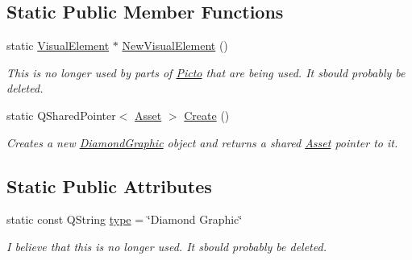 \subsection*{Static Public Member Functions}
\begin{DoxyCompactItemize}
\item 
\hypertarget{class_picto_1_1_diamond_graphic_a43c6757967cb0b0a8de9d6ec728717c8}{static \hyperlink{struct_picto_1_1_visual_element}{Visual\-Element} $\ast$ \hyperlink{class_picto_1_1_diamond_graphic_a43c6757967cb0b0a8de9d6ec728717c8}{New\-Visual\-Element} ()}\label{class_picto_1_1_diamond_graphic_a43c6757967cb0b0a8de9d6ec728717c8}

\begin{DoxyCompactList}\small\item\em This is no longer used by parts of \hyperlink{namespace_picto}{Picto} that are being used. It sbould probably be deleted. \end{DoxyCompactList}\item 
\hypertarget{class_picto_1_1_diamond_graphic_af1b8d46d4894ff874f52c3f6cf7cfb6f}{static Q\-Shared\-Pointer$<$ \hyperlink{class_picto_1_1_asset}{Asset} $>$ \hyperlink{class_picto_1_1_diamond_graphic_af1b8d46d4894ff874f52c3f6cf7cfb6f}{Create} ()}\label{class_picto_1_1_diamond_graphic_af1b8d46d4894ff874f52c3f6cf7cfb6f}

\begin{DoxyCompactList}\small\item\em Creates a new \hyperlink{class_picto_1_1_diamond_graphic}{Diamond\-Graphic} object and returns a shared \hyperlink{class_picto_1_1_asset}{Asset} pointer to it. \end{DoxyCompactList}\end{DoxyCompactItemize}
\subsection*{Static Public Attributes}
\begin{DoxyCompactItemize}
\item 
\hypertarget{class_picto_1_1_diamond_graphic_a6ff7ab9b0e3b296e14e550f80b8a441d}{static const Q\-String \hyperlink{class_picto_1_1_diamond_graphic_a6ff7ab9b0e3b296e14e550f80b8a441d}{type} = \char`\"{}Diamond Graphic\char`\"{}}\label{class_picto_1_1_diamond_graphic_a6ff7ab9b0e3b296e14e550f80b8a441d}

\begin{DoxyCompactList}\small\item\em I believe that this is no longer used. It sbould probably be deleted. \end{DoxyCompactList}\end{DoxyCompactItemize}
